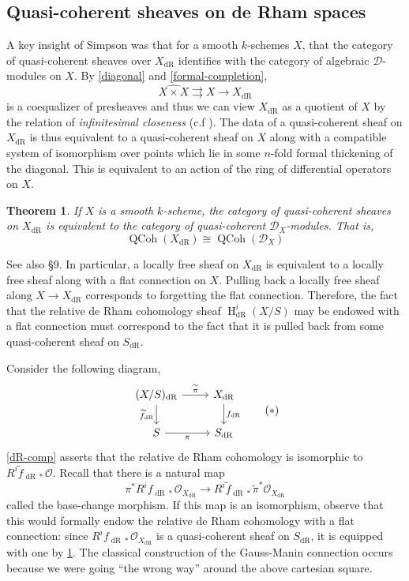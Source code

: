 \documentclass{article}
\newtheorem{theorem}{Theorem}[section]
\theoremstyle{definition}
\theoremstyle{remark}
\newcommand{\scr}[1]{\mathscr{#1}}
\DeclareMathOperator{\qcoh}{QCoh}
\DeclareMathOperator{\dr}{dR}
\DeclareMathOperator{\h}{H}
\begin{document}
\subsection{Quasi-coherent sheaves on de Rham spaces} 
A key insight of Simpson was that for a smooth $k$-schemes $X$, that the category of quasi-coherent sheaves over $X_{\dr}$ identifies with the category of algebraic $\scr{D}$-modules on $X$. By \ref{diagonal} and \ref{formal-completion},
$$ \widehat{X \times X} \rightrightarrows X \to X_{\dr} $$
is a coequalizer of presheaves and thus we can view $X_{\dr}$ as a quotient of $X$ by the relation of \emph{infinitesimal closeness} (c.f \cite{Lur}). The data of a quasi-coherent sheaf on $X_{\dr}$ is thus equivalent to a quasi-coherent sheaf on $X$ along with a compatible system of isomorphism over points which lie in some $n$-fold formal thickening of the diagonal. This is equivalent to an action of the ring of differential operators on $X$.

\begin{theorem}\label{equiv1} If $X$ is a smooth $k$-scheme, the category of quasi-coherent sheaves on $X_{\dr}$ is equivalent to the category of quasi-coherent $\scr{D}_X$-modules. That is,
$$\qcoh(X_{\dr}) \cong \qcoh(\scr{D}_X)$$
\end{theorem}

See also \cite{Rod25} \S 9. In particular, a locally free sheaf on $X_{\dr}$ is equivalent to a locally free sheaf along with a flat connection on $X$. Pulling back a locally free sheaf along $X \to X_{\dr}$ corresponds to forgetting the flat connection. Therefore, the fact that the relative de Rham cohomology sheaf $\h^i_{\dr}(X/S)$ may be endowed with a flat connection must correspond to the fact that it is pulled back from some quasi-coherent sheaf on $S_{\dr}$.


Consider the following diagram,
\[\begin{tikzcd}
  {(X/S)_{\dr}} & {X_{\dr}} \\
  S & {S_{\dr}}
  \arrow["{\widetilde{\pi}}", from=1-1, to=1-2]
  \arrow["{\widetilde{f}_{\dr}}"', from=1-1, to=2-1]
  \arrow["\pi"', from=2-1, to=2-2]
  \arrow["{f_{\dr}}", from=1-2, to=2-2]
\end{tikzcd}\tag{$\ast$}\]
\ref{dR-comp} asserts that the relative de Rham cohomology is isomorphic to $R^i \widetilde{f}_{\dr*} \scr{O}$. Recall that there is a natural map
\[\pi^* R^i f_{\dr*} \scr{O}_{X_{\dr}} \to R^i \widetilde{f}_{\dr*} \widetilde{\pi}^* \scr{O}_{X_{\dr}}
\] 
called the base-change morphism. If this map is an isomorphism, observe that this would formally endow the relative de Rham cohomology with a flat connection: since $R^i f_{\dr*} \scr{O}_{X_{\dr}}$ is a quasi-coherent sheaf on $S_{\dr}$, it is equipped with one by \ref{equiv1}. The classical construction of the Gauss-Manin connection occurs because we were going ``the wrong way'' around the above cartesian square.
\end{document}

